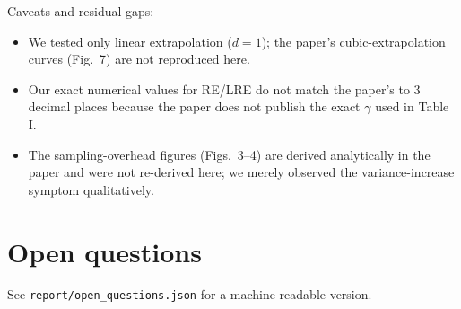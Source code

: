 \documentclass[11pt]{article}
\begin{document}
Caveats and residual gaps:
\begin{itemize}
  \item We tested only linear extrapolation ($d=1$); the paper's cubic-extrapolation
        curves (Fig.\ 7) are not reproduced here.
  \item Our exact numerical values for RE/LRE do not match the paper's to
        3 decimal places because the paper does not publish the exact
        $\gamma$ used in Table I.
  \item The sampling-overhead figures (Figs.\ 3--4) are derived analytically in
        the paper and were not re-derived here; we merely observed the
        variance-increase symptom qualitatively.
\end{itemize}

\section{Open questions}
\label{sec:openq}
See \texttt{report/open\_questions.json} for a machine-readable version.
\end{document}
